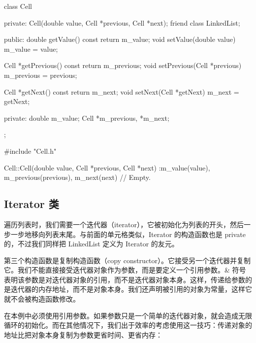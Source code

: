 \medskip{}

\begin{codebox}
class Cell {
  private:
    Cell(double value, Cell *previous, Cell *next);
    friend class LinkedList;

  public:
    double getValue() const { return m_value; }
    void setValue(double value) { m_value = value; }

    Cell *getPrevious() const { return m_previous; }
    void setPrevious(Cell *previous) { m_previous = previous; }

    Cell *getNext() const { return m_next; }
    void setNext(Cell *getNext) { m_next = getNext; }

  private:
    double m_value;
    Cell *m_previous, *m_next;
};
\end{codebox}

\medskip{}

\begin{codebox}
#include "Cell.h"

Cell::Cell(double value, Cell *previous, Cell *next)
 :m_value(value),
  m_previous(previous),
  m_next(next) {
  // Empty.
}
\end{codebox}

\subsection{Iterator 类}

遍历列表时，我们需要一个迭代器（iterator），它被初始化为列表的开头，然后一步一步地移向列表末尾。与前面的单元格类似，Iterator 的构造函数也是 private 的，不过我们同样把 LinkedList 定义为 Iterator 的友元。

\medskip{}

\begin{codebox}
class Iterator {
  private:
    Iterator(Cell *cellPtr);
    friend class LinkedList;

  public:
    Iterator();
\end{codebox}

第三个构造函数是复制构造函数（copy constructor）。它接受另一个迭代器并复制它。我们不能直接接受迭代器对象作为参数，而是要定义一个引用参数。\& 符号表明该参数是对迭代器对象的引用，而不是迭代器对象本身。这样，传递给参数的是迭代器的内存地址，而不是对象本身。我们还声明被引用的对象为常量，这样它就不会被构造函数修改。

在本例中必须使用引用参数。如果参数只是一个简单的迭代器对象，就会造成无限循环的初始化。而在其他情况下，我们出于效率的考虑使用这一技巧：传递对象的地址比把对象本身复制为参数更省时间、更省内存：

